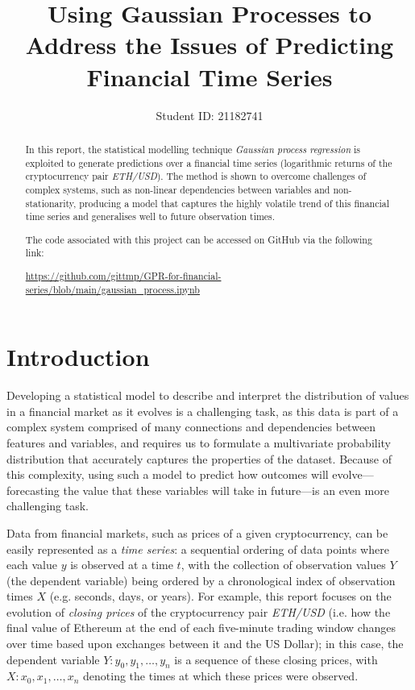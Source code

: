 \documentclass[a4paper, 11pt]{article}
\title{Using Gaussian Processes to Address the Issues of Predicting Financial Time Series}
\author{Student ID: 21182741}
\date{}
\begin{document}
    \maketitle

    \begin{abstract}
        In this report, the statistical modelling technique \emph{Gaussian process regression} is exploited to generate predictions over a financial time series (logarithmic returns of the cryptocurrency pair \emph{ETH/USD}). The method is shown to overcome challenges of complex systems, such as non-linear dependencies between variables and non-stationarity, producing a model that captures the highly volatile trend of this financial time series and generalises well to future observation times.   

        The code associated with this project can be accessed on GitHub via the following link: 
        
        {\scriptsize \url{https://github.com/gittmp/GPR-for-financial-series/blob/main/gaussian_process.ipynb}}
    \end{abstract}

    \section{Introduction}

    Developing a statistical model to describe and interpret the distribution of values in a financial market as it evolves is a challenging task, as this data is part of a complex system comprised of many connections and dependencies between features and variables, and requires us to formulate a multivariate probability distribution that accurately captures the properties of the dataset. Because of this complexity, using such a model to predict how outcomes will evolve---forecasting the value that these variables will take in future---is an even more challenging task. 

    Data from financial markets, such as prices of a given cryptocurrency, can be easily represented as a \emph{time series}: a sequential ordering of data points where each value $y$ is observed at a time $t$, with the collection of observation values $Y$ (the dependent variable) being ordered by a chronological index of observation times $X$ (e.g. seconds, days, or years). For example, this report focuses on the evolution of \emph{closing prices} of the cryptocurrency pair \emph{ETH/USD} (i.e. how the final value of Ethereum at the end of each five-minute trading window changes over time based upon exchanges between it and the US Dollar); in this case, the dependent variable $Y \colon y_0, y_1, \ldots, y_n$ is a sequence of these closing prices, with $X \colon x_0, x_1, \ldots, x_n$ denoting the times at which these prices were observed.
\end{document}
